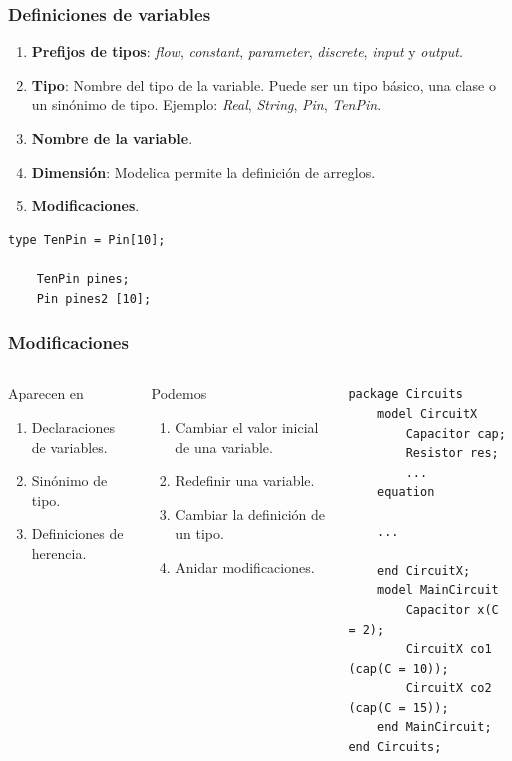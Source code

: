 \documentclass[aspectratio=169,10pt]{beamer}
\begin{document}
\begin{frame}[fragile]
\frametitle{Definiciones de variables} 
\begin{enumerate}
\item \textbf{Prefijos de tipos}: \textit{flow}, \textit{constant}, \textit{parameter}, \textit{discrete}, \textit{input} y \textit{output}.
\item \textbf{Tipo}: Nombre del tipo de la variable. Puede ser un tipo básico, una clase o un sinónimo de tipo.  Ejemplo: \textit{Real}, \textit{String}, \textit{Pin}, \textit{TenPin}.
\item \textbf{Nombre de la variable}. 
\item \textbf{Dimensión}: Modelica permite la definición de arreglos.
\item \textbf{Modificaciones}.
\end{enumerate}
\begin{lstlisting}[style=base]
    type TenPin = Pin[10];  
    
    TenPin pines;
    Pin pines2 [10];
\end{lstlisting}
\par

\end{frame}

\begin{frame}[fragile]
\frametitle{Modificaciones} 

\begin{columns}  
\column[T]{7cm}
\begin{block}{Aparecen en}
\begin{enumerate}
    \item Declaraciones de variables.
    \item Sinónimo de tipo.
    \item Definiciones de herencia.
\end{enumerate} 
\end{block}

\begin{block}{Podemos}
\begin{enumerate}
    \item Cambiar el valor inicial de una variable.    
    \item Redefinir una variable.
    \item Cambiar la definición de un tipo.
    \item Anidar modificaciones.
\end{enumerate}
\end{block}
\column[T]{7cm}
\begin{lstlisting}[style=base]
package Circuits
    model CircuitX
        Capacitor cap;
        Resistor res;
        ...
    equation 
    
    ...
        
    end CircuitX;
    model MainCircuit
        Capacitor x(C = 2);
        CircuitX co1 (cap(C = 10));
        CircuitX co2 (cap(C = 15));
    end MainCircuit;
end Circuits;
\end{lstlisting}

 
\end{columns}
\end{frame}
\end{document}
